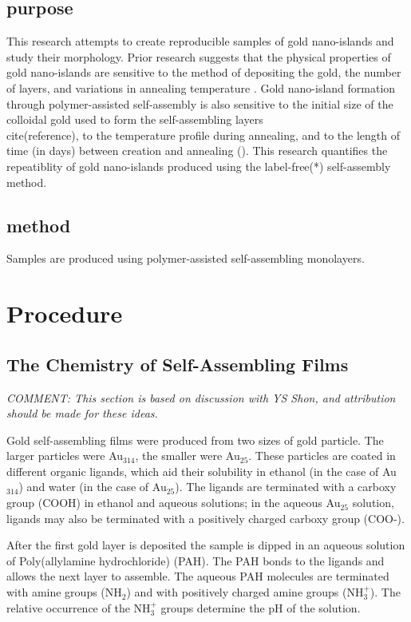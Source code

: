 \documentclass[12pt,oneside,english]{article}
\begin{document}
	\subsection{purpose}
	This research attempts to create reproducible samples of gold nano-islands and study their morphology.
	Prior research suggests that the physical properties of gold nano-islands are sensitive to the method of depositing the gold, the number of layers, and variations in annealing temperature \cite{shon07}.  
	Gold nano-island formation through polymer-assisted self-assembly is also sensitive to the initial size of the colloidal gold used to form the self-assembling layers \\cite(reference), to the temperature profile during annealing, and to the length of time (in days) between creation and annealing (\cite{joshi}).
	This research quantifies the repeatiblity of gold nano-islands produced using the label-free(*) self-assembly method.

	\subsection{method}
	Samples are produced using polymer-assisted self-assembling monolayers.

	\section{Procedure}

	\subsection{The Chemistry of Self-Assembling Films}
	
	\emph{COMMENT: This section is based on discussion with YS Shon, and attribution should be made for these ideas.}
	
	Gold self-assembling films were produced from two sizes of gold particle.  
	The larger particles were Au$_{314}$, the smaller were Au$_{25}$.  
	These particles are coated in different organic ligands, which aid their solubility in ethanol (in the case of Au$_{314}$) and water (in the case of Au$_{25}$).    
	The ligands are terminated with a carboxy group (COOH) in ethanol and aqueous solutions; in the aqueous Au$_{25}$ solution, ligands may also be terminated with a positively charged carboxy group (COO-). 
	
	After the first gold layer is deposited the sample is dipped in an aqueous solution of Poly(allylamine hydrochloride) (PAH).  
	The PAH bonds to the ligands and allows the next layer to assemble.  	
	The aqueous PAH molecules are terminated with amine groups (NH$_2$) and with positively charged amine groups (NH$_3^+$).  
	The relative occurrence of the NH$_3^+$ groups determine the pH of the solution.
	
\end{document}
